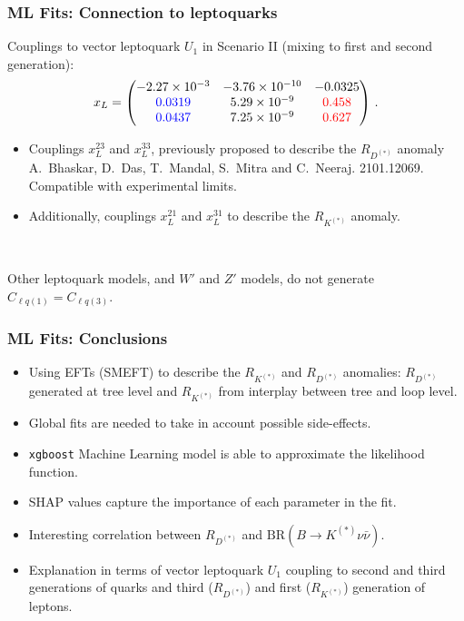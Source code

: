 \documentclass[mathserif, 10pt, dvipsnames]{beamer}
\newcommand\colorcite[1]{{\scriptsize\color{unizarblue}#1}}
\begin{document}
\begin{frame}\frametitle{ML Fits: Connection to leptoquarks}

    Couplings to vector leptoquark $U_1$ in Scenario II (mixing to first and second generation):
    $$x_L = \begin{pmatrix}
            -2.27\times10^{-3}   & -3.76\times 10^{-10} & -0.0325            \\
            {\color{blue}0.0319} & 5.29\times 10^{-9}   & {\color{red}0.458} \\
            {\color{blue}0.0437} & 7.25\times 10^{-9}   & {\color{red}0.627}
        \end{pmatrix}\,.
    $$
    \begin{itemize}
\item Couplings {\color{red}$x_L^{23}$} and {\color{red}$x_L^{33}$}, previously proposed to describe the $R_{D^{(*)}}$ anomaly \colorcite{A.~Bhaskar, D.~Das, T.~Mandal, S.~Mitra and C.~Neeraj. 2101.12069}. Compatible with experimental limits.
        \item Additionally, couplings {\color{blue}$x_L^{21}$} and {\color{blue}$x_L^{31}$} to describe the $R_{K^{(*)}}$ anomaly.
    \end{itemize}

    ~

    Other leptoquark models, and $W'$ and $Z'$ models, do not generate $C_{\ell q(1)} = C_{\ell q (3)}$.
\end{frame}

\begin{frame}\frametitle{ML Fits: Conclusions}

    \begin{itemize}
        \item Using EFTs (SMEFT) to describe the $R_{K^{(*)}}$ and $R_{D^{(*)}}$ anomalies: $R_{D^{(*)}}$ generated at tree level and $R_{K^{(*)}}$ from interplay between tree and loop level.
        \item Global fits are needed to take in account possible side-effects.
        \item \texttt{xgboost} Machine Learning model is able to approximate the likelihood function.
        \item SHAP values capture the importance of each parameter in the fit.
        \item Interesting correlation between $R_{D^{(*)}}$ and $\mathrm{BR}(B\to K^{(*)}\nu\bar{\nu})$.
        \item Explanation in terms of vector leptoquark $U_1$ coupling to second and third generations of quarks and third ($R_{D^{(*)}}$) and first ($R_{K^{(*)}}$) generation of leptons.
    \end{itemize}

\end{frame}
\end{document}
